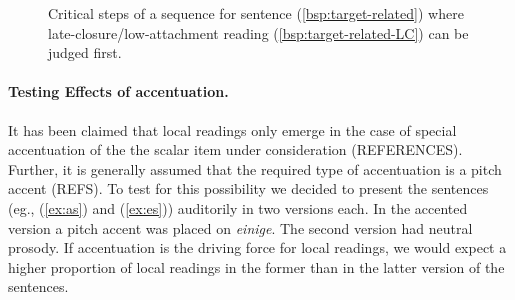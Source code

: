 \documentclass[fleqn,reqno,10pt,draft]{article}
\begin{document}
\begin{figure}[ht]
	\centering
	\caption[]{Critical steps of a sequence for sentence
          (\ref{bsp:target-related}) where
          late-closure/low-attachment reading
          (\ref{bsp:target-related-LC}) can be judged first.}
	\label{fig:exec}
\end{figure}


\paragraph{Testing Effects of accentuation.} It
has been claimed that local readings only emerge in the case of
special accentuation of the the scalar item under consideration
(REFERENCES). Further, it is generally assumed that the required type
of accentuation is a pitch accent (REFS). To test for this possibility
we decided to present the sentences (eg., (\ref{ex:as}) and
(\ref{ex:es})) auditorily in two versions each. In the accented
version a pitch accent was placed on {\it einige}. The second version
had neutral prosody. If accentuation is the driving force for local
readings, we would expect a higher proportion of local readings in the
former than in the latter version of the sentences.
\end{document}
